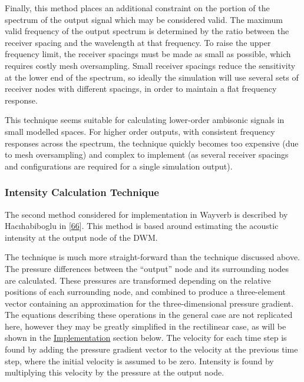 \documentclass[]{scrreprt}
\begin{document}
Finally, this method places an additional constraint on the portion of
the spectrum of the output signal which may be considered valid. The
maximum valid frequency of the output spectrum is determined by the
ratio between the receiver spacing and the wavelength at that frequency.
To raise the upper frequency limit, the receiver spacings must be made
as small as possible, which requires costly mesh oversampling. Small
receiver spacings reduce the sensitivity at the lower end of the
spectrum, so ideally the simulation will use several sets of receiver
nodes with different spacings, in order to maintain a flat frequency
response.

This technique seems suitable for calculating lower-order ambisonic
signals in small modelled spaces. For higher order outputs, with
consistent frequency responses across the spectrum, the technique
quickly becomes too expensive (due to mesh oversampling) and complex to
implement (as several receiver spacings and configurations are required
for a single simulation output).

\subsubsection{Intensity Calculation
Technique}\label{intensity-calculation-technique}

The second method considered for implementation in Wayverb is described
by Hacıhabiboglu in
{[}\protect\hyperlink{ref-hacihabibogluux5fsimulationux5f2010}{66}{]}.
This method is based around estimating the acoustic intensity at the
output node of the DWM.

The technique is much more straight-forward than the technique discussed
above. The pressure differences between the ``output'' node and its
surrounding nodes are calculated. These pressures are transformed
depending on the relative positions of each surrounding node, and
combined to produce a three-element vector containing an approximation
for the three-dimensional pressure gradient. The equations describing
these operations in the general case are not replicated here, however
they may be greatly simplified in the rectilinear case, as will be shown
in the \protect\hyperlink{implementation-3}{Implementation} section
below. The velocity for each time step is found by adding the pressure
gradient vector to the velocity at the previous time step, where the
initial velocity is assumed to be zero. Intensity is found by
multiplying this velocity by the pressure at the output node.
\end{document}
